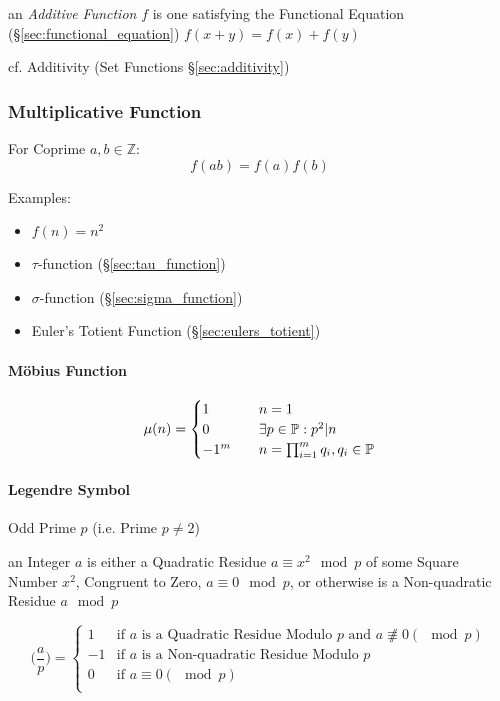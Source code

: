 an \emph{Additive Function} $f$ is one satisfying the Functional Equation
(\S\ref{sec:functional_equation}) $f(x+y) = f(x) + f(y)$

cf. Additivity (Set Functions \S\ref{sec:additivity})



\subsubsection{Multiplicative Function}\label{sec:multiplicative_function}

For Coprime $a,b \in \mathbb{Z}$:
\[
  f(ab) = f(a)f(b)
\]

Examples:
\begin{itemize}
  \item $f(n) = n^2$
  \item $\tau$-function (\S\ref{sec:tau_function})
  \item $\sigma$-function (\S\ref{sec:sigma_function})
  \item Euler's Totient Function (\S\ref{sec:eulers_totient})
\end{itemize}



\paragraph{M\"obius Function}\label{sec:mobius_function}\hfill

\[
  \mu(n) =
  \begin{cases}
  1     & \quad n = 1 \\
  0     & \quad \exists p \in \mathbb{P} : p^2|n \\
  -1^m  & \quad n = \prod_{i = 1}^m q_i, q_i \in \mathbb{P} \\
  \end{cases}
\]



\paragraph{Legendre Symbol}\label{sec:legendre_symbol}\hfill

Odd Prime $p$ (i.e. Prime $p \neq 2$)

an Integer $a$ is either a Quadratic Residue $a \equiv x^2 \mod p$ of some
Square Number $x^2$, Congruent to Zero, $a \equiv 0 \mod p$, or otherwise is
a Non-quadratic Residue $a \mod p$

\[
  \Big(\frac{a}{p}\Big) = \begin{cases}
    1  & \text{if }a\text{ is a Quadratic Residue Modulo }p\text{ and }
          a \not\nequiv 0 (\mod p) \\
    -1 & \text{if }a\text{ is a Non-quadratic Residue Modulo }p \\
    0  & \text{if }a \equiv 0 (\mod p) \\
  \end{cases}
\]

